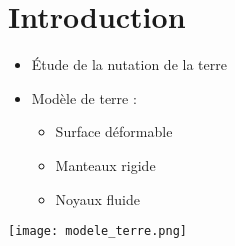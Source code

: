 \section{Introduction}

\begin{frame}

  \begin{itemize}
    \item \'Etude de la nutation de la terre 
    \item Modèle de terre :
      \begin{itemize}
        \item Surface déformable
        \item Manteaux rigide
        \item Noyaux fluide
      \end{itemize}
  \end{itemize}

  \centerline{\texttt{[image: modele\_terre.png]}}
\end{frame}

